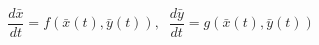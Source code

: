 \begin{equation}%
\frac{d\bar{x}}{dt} = f \left( \bar{x} (t), \bar{y}(t) \right), \; \;
\frac{d\bar{y}}{dt} = g \left( \bar{x}(t), \bar{y}(t) \right)
\end{equation}

